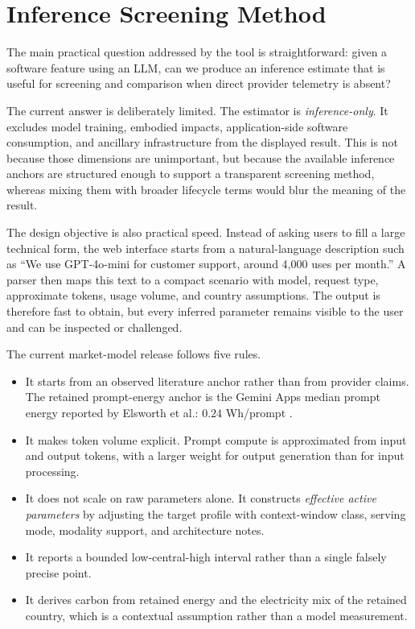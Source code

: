\documentclass[runningheads]{llncs}
\begin{document}
\section{Inference Screening Method}
The main practical question addressed by the tool is straightforward: given a software feature using an LLM, can we produce an inference estimate that is useful for screening and comparison when direct provider telemetry is absent?

The current answer is deliberately limited. The estimator is \emph{inference-only}. It excludes model training, embodied impacts, application-side software consumption, and ancillary infrastructure from the displayed result. This is not because those dimensions are unimportant, but because the available inference anchors are structured enough to support a transparent screening method, whereas mixing them with broader lifecycle terms would blur the meaning of the result.

The design objective is also practical speed. Instead of asking users to fill a large technical form, the web interface starts from a natural-language description such as ``We use GPT-4o-mini for customer support, around 4{,}000 uses per month.'' A parser then maps this text to a compact scenario with model, request type, approximate tokens, usage volume, and country assumptions. The output is therefore fast to obtain, but every inferred parameter remains visible to the user and can be inspected or challenged.

The current market-model release follows five rules.
\begin{itemize}
\item It starts from an observed literature anchor rather than from provider claims. The retained prompt-energy anchor is the Gemini Apps median prompt energy reported by Elsworth et al.: $0.24$ Wh/prompt \cite{elsworth2025}.
\item It makes token volume explicit. Prompt compute is approximated from input and output tokens, with a larger weight for output generation than for input processing.
\item It does not scale on raw parameters alone. It constructs \emph{effective active parameters} by adjusting the target profile with context-window class, serving mode, modality support, and architecture notes.
\item It reports a bounded low-central-high interval rather than a single falsely precise point.
\item It derives carbon from retained energy and the electricity mix of the retained country, which is a contextual assumption rather than a model measurement.
\end{itemize}
\end{document}
